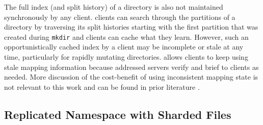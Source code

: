 The full index (and split history) of a directory
is also not maintained synchronously by any client.
\giga clients can search through the partitions of a directory by traversing
its split histories starting with the first partition that was created during
\texttt{mkdir} and clients can cache what they learn.
However, such an opportunistically cached index by a client may be
incomplete or stale at any time, particularly for rapidly mutating directories.
\giga allows clients to keep using stale mapping information
because addressed servers verify and brief to clients as needed.
More discussion of the cost-benefit of using
inconsistent mapping state is not relevant to this work and can be found in
prior \giga{} literature \cite{GIGA07, GIGA11}.

\subsection{Replicated Namespace with Sharded Files}
